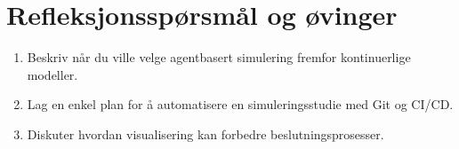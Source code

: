 \section{Refleksjonsspørsmål og øvinger}
\begin{enumerate}
    \item Beskriv når du ville velge agentbasert simulering fremfor kontinuerlige modeller.
    \item Lag en enkel plan for å automatisere en simuleringsstudie med Git og CI/CD.
    \item Diskuter hvordan visualisering kan forbedre beslutningsprosesser.
\end{enumerate}
